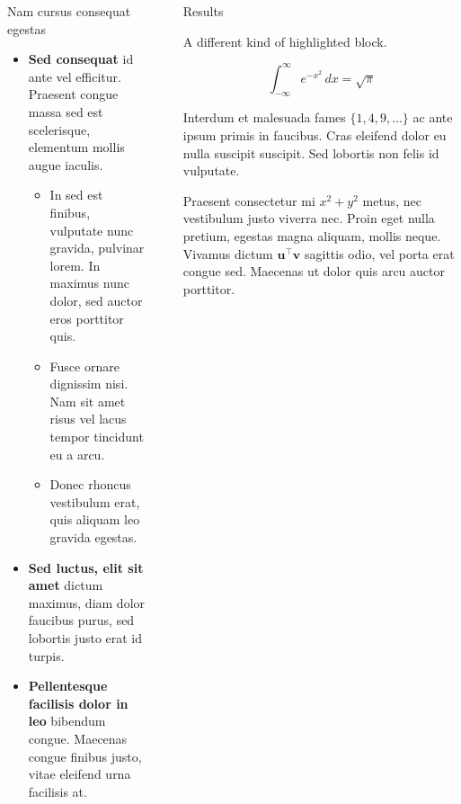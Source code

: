 \documentclass[final]{beamer}
\newlength{\sepwidth}
\newlength{\colwidth}
\newcommand{\separatorcolumn}{\begin{column}{\sepwidth}\end{column}}
\begin{document}
\begin{frame}[t]
\begin{columns}[t]
\begin{column}{\colwidth}
\begin{block}{Nam cursus consequat egestas}
    \begin{itemize}
      \item \textbf{Sed consequat} id ante vel efficitur. Praesent congue massa
        sed est scelerisque, elementum mollis augue iaculis.
        \begin{itemize}
          \item In sed est finibus, vulputate
            nunc gravida, pulvinar lorem. In maximus nunc dolor, sed auctor eros
            porttitor quis.
          \item Fusce ornare dignissim nisi. Nam sit amet risus vel lacus
            tempor tincidunt eu a arcu.
          \item Donec rhoncus vestibulum erat, quis aliquam leo
            gravida egestas.
        \end{itemize}
      \item \textbf{Sed luctus, elit sit amet} dictum maximus, diam dolor
        faucibus purus, sed lobortis justo erat id turpis.
      \item \textbf{Pellentesque facilisis dolor in leo} bibendum congue.
        Maecenas congue finibus justo, vitae eleifend urna facilisis at.
    \end{itemize}

  \end{block}

\end{column}

\separatorcolumn

\begin{column}{\colwidth}

  \begin{exampleblock}{Results}

    A different kind of highlighted block.

    $$
    \int_{-\infty}^{\infty} e^{-x^2}\,dx = \sqrt{\pi}
    $$

    Interdum et malesuada fames $\{1, 4, 9, \ldots\}$ ac ante ipsum primis in
    faucibus. Cras eleifend dolor eu nulla suscipit suscipit. Sed lobortis non
    felis id vulputate.


    Praesent consectetur mi $x^2 + y^2$ metus, nec vestibulum justo viverra
    nec. Proin eget nulla pretium, egestas magna aliquam, mollis neque. Vivamus
    dictum $\mathbf{u}^\intercal\mathbf{v}$ sagittis odio, vel porta erat
    congue sed. Maecenas ut dolor quis arcu auctor porttitor.


\end{exampleblock}
\end{column}
\end{columns}
\end{frame}
\end{document}
